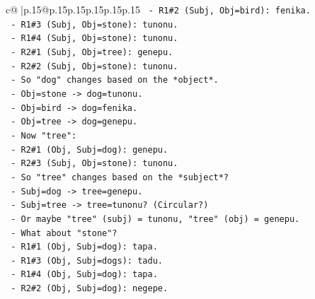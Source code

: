 \documentclass{article}
\begin{document}
{\begin{supertabular}{c@{$\;$}|p{.15\linewidth}@{}p{.15\linewidth}p{.15\linewidth}p{.15\linewidth}p{.15\linewidth}p{.15\linewidth}}
{{{\texttt{                                          {-} R1\#2 (Subj, Obj=bird): fenika.} \\
\texttt{                                          {-} R1\#3 (Subj, Obj=stone): tunonu.} \\
\texttt{                                          {-} R1\#4 (Subj, Obj=stone): tunonu.} \\
\texttt{                                          {-} R2\#1 (Subj, Obj=tree): genepu.} \\
\texttt{                                          {-} R2\#2 (Subj, Obj=stone): tunonu.} \\
\texttt{                                        {-} So "dog" changes based on the *object*.} \\
\texttt{                                          {-} Obj=stone {-}> dog=tunonu.} \\
\texttt{                                          {-} Obj=bird {-}> dog=fenika.} \\
\texttt{                                          {-} Obj=tree {-}> dog=genepu.} \\
\texttt{                                        {-} Now "tree":} \\
\texttt{                                          {-} R2\#1 (Obj, Subj=dog): genepu.} \\
\texttt{                                          {-} R2\#3 (Subj, Obj=stone): tunonu.} \\
\texttt{                                        {-} So "tree" changes based on the *subject*?} \\
\texttt{                                          {-} Subj=dog {-}> tree=genepu.} \\
\texttt{                                          {-} Subj=tree {-}> tree=tunonu? (Circular?)} \\
\texttt{                                          {-} Or maybe "tree" (subj) = tunonu, "tree" (obj) = genepu.} \\
\texttt{                                        {-} What about "stone"?} \\
\texttt{                                          {-} R1\#1 (Obj, Subj=dog): tapa.} \\
\texttt{                                          {-} R1\#3 (Obj, Subj=dogs): tadu.} \\
\texttt{                                          {-} R1\#4 (Obj, Subj=dog): tapa.} \\
\texttt{                                          {-} R2\#2 (Obj, Subj=dog): negepe.} \\
}}}
\end{supertabular}}
\end{document}
